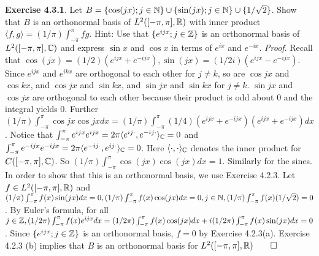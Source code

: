 {\bf Exercise 4.3.1}. Let $B= \{\cos(jx);j\in \mathbb{N}\} \cup\{\sin(jx); j \in \mathbb{N}\} \cup \{1/\sqrt{2}\}$. Show that $B$ is an orthonormal basis of $L^2([-\pi,\pi],\mathbb{R})$ with inner product $\langle f,g \rangle = (1/\pi) \int_{-\pi}^{\pi}fg$. Hint:  Use that $\{e^{ijx};j \in \mathbb{Z}\}$ is an orthonormal basis of $L^2([-\pi,\pi],\mathbb{C})$ and express $\sin x$ and $\cos x$ in terms of $e^{ix}$ and $e^{-ix}$. {\it Proof}. Recall that $\cos(jx)=(1/2)(e^{ijx}+e^{-ijx}), \sin(jx)=(1/2i)(e^{ijx}-e^{-ijx})$. Since $e^{ijx}$ and $e^{ikx}$ are orthogonal to each other for $j \neq k$, so are $\cos jx$ and $\cos kx$, and $\cos jx$ and $\sin kx$, and $\sin jx$ and $\sin kx$ for $j \neq k$. $\sin jx$ and $\cos jx$ are orthogonal to each other because their product is odd about 0 and the integral yields 0. Further $(1/\pi)\int_{-\pi}^{\pi}\cos jx \cos jx dx = (1/\pi)\int_{-\pi}^{\pi}(1/4)(e^{ijx}+e^{-ijx})(e^{ijx}+e^{-ijx}) dx $. Notice that $\int_{-\pi}^{\pi}e^{ijx}e^{ijx}=2\pi\langle e^{ij\cdot},e^{-ij\cdot}\rangle_{\mathbb{C}}=0$ and $\int_{-\pi}^{\pi}e^{-ijx}e^{-ijx}=2\pi\langle e^{-ij\cdot},e^{ij\cdot}\rangle_{\mathbb{C}}=0$. Here $\langle \cdot, \cdot \rangle_{\mathbb{C}}$ denotes the inner product for $C([-\pi,\pi], \mathbb{C})$. So $(1/\pi)\int_{-\pi}^{\pi}\cos(jx) \cos (jx) dx =1$. Similarly for the sines. In order to show that this is an orthonormal basis, we use Exercise 4.2.3. Let $f \in L^2([-\pi,\pi], \mathbb{R})$ and $(1/\pi)\int_{-\pi}^{\pi}f(x)\sin(jx) dx =0, (1/\pi)\int_{-\pi}^{\pi}f(x)\cos(jx) dx =0, j\in \mathbb{N}, (1/\pi)\int_{-\pi}^{\pi}f(x)(1/\sqrt{2})=0$. By Euler's formula, for all $j \in \mathbb{Z}, (1/2\pi)\int_{-\pi}^{\pi}f(x)e^{ijx} dx =(1/2\pi)\int_{-\pi}^{\pi}f(x)\cos(jx) dx +i(1/2\pi)\int_{-\pi}^{\pi}f(x)\sin(jx) dx =0$. Since $\{e^{ijx}; j \in \mathbb{Z}\}$ is an orthonormal basis, $f=0$ by Exercise 4.2.3(a). Exercise 4.2.3 (b) implies that $B$ is an orthonormal basis for $L^2([-\pi,\pi],\mathbb{R}) \qed$